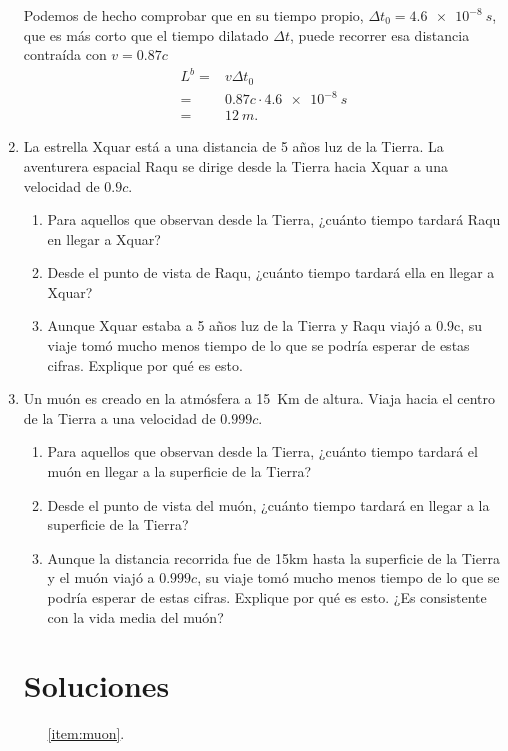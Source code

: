 \documentclass[11pt,a4paper]{article}
\begin{document}
\begin{enumerate}
Podemos de hecho comprobar que en su tiempo propio, $\Delta t_0 = \qty{4.6e-8}{s}$, que es más corto que el tiempo dilatado $\Delta t$, puede recorrer esa distancia contraída con $v=0.87c$
\begin{align*}
    L^{b} = &v \Delta t_0 \\
    =&0.87 c \cdot \qty{4.6e-8}{s}\\
    =&\qty{12}{ m }.
\end{align*}

    
 \item La estrella Xquar está a una distancia de 5 años luz de la
Tierra. La aventurera espacial Raqu se dirige desde la Tierra
hacia Xquar a una velocidad de $0.9c$.
\begin{enumerate}[label=(\alph*)]
    \item Para aquellos que observan desde la Tierra, ¿cuánto tiempo tardará
Raqu en llegar a Xquar?
\item Desde el punto de vista de Raqu, ¿cuánto tiempo tardará ella
en llegar a Xquar?
\item Aunque Xquar estaba a 5 años luz de la Tierra
y Raqu viajó a 0.9c, su viaje tomó mucho
menos tiempo de lo que se podría esperar de estas cifras.
Explique por qué es esto.
\end{enumerate}


\item Un muón es creado en la atmósfera a 15~Km de altura. Viaja hacia el centro de la Tierra a una velocidad de $0.999c$. 
\label{item:muon}

\begin{enumerate}[label=(\alph*)]
    \item Para aquellos que observan desde la Tierra, ¿cuánto tiempo tardará
el muón en llegar a la superficie de la Tierra?
\item Desde el punto de vista del muón, ¿cuánto tiempo tardará
en llegar a la superficie de la Tierra?
\item Aunque la distancia recorrida fue de 15km hasta la superficie de la Tierra y el muón viajó a $0.999c$, 
su viaje tomó mucho
menos tiempo de lo que se podría esperar de estas cifras.
Explique por qué es esto. ¿Es consistente con la vida media del muón?
\end{enumerate}

\section*{Soluciones}

\begin{itemize}
    \item[\ref{item:muon}.]


\end{itemize}
\end{enumerate}
\end{document}
